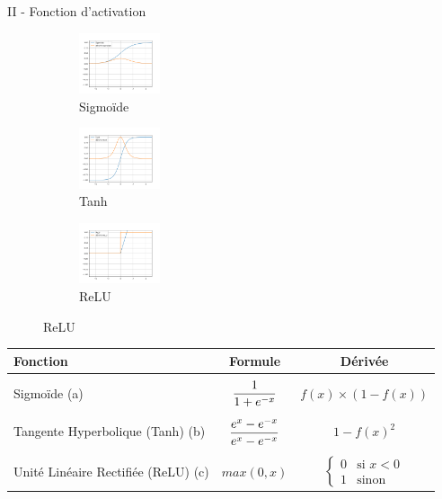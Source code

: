 \documentclass[10pt]{beamer}
\begin{document}
\begin{frame}{II - Fonction d'activation}
\begin{figure}
	\begin{subfigure}[]{0.3\textwidth}
		\includegraphics[width=90px]{0-Sigmoide.png}
  		\caption{Sigmoïde}
	\end{subfigure}
	\begin{subfigure}[]{0.3\textwidth}
		\includegraphics[width=90px]{0-Tanh.png}
  		\caption{Tanh}
	\end{subfigure}
	\begin{subfigure}[]{0.3\textwidth}
		\includegraphics[width=90px]{0-ReLU.png}
		\caption{ReLU}
	\end{subfigure}
\end{figure}

\begin{block}{}
\centering
\begin{tabular}{ l || c | c | }
   Fonction & Formule & Dérivée \\ \hline \\
   Sigmoïde (a) & $\mathlarger{\frac{1}{1+e^{-x}}}$ & $f(x) \times (1-f(x))$ \\ \\
   Tangente Hyperbolique (Tanh) (b) & $\mathlarger{\frac{e^{x}-e^{-x}}{e^{x}-e^{-x}}}$ & $1-f(x)^2$ \\ \\
   Unité Linéaire Rectifiée (ReLU) (c) & $max(0, x)$ & $ \left\{\begin{array}{ll}
      														  0 & \mbox{si } x<0 \\
     														  1 & \mbox{sinon }   \end{array}\right.$ \\
\end{tabular}
\end{block}
\end{frame}
\end{document}
